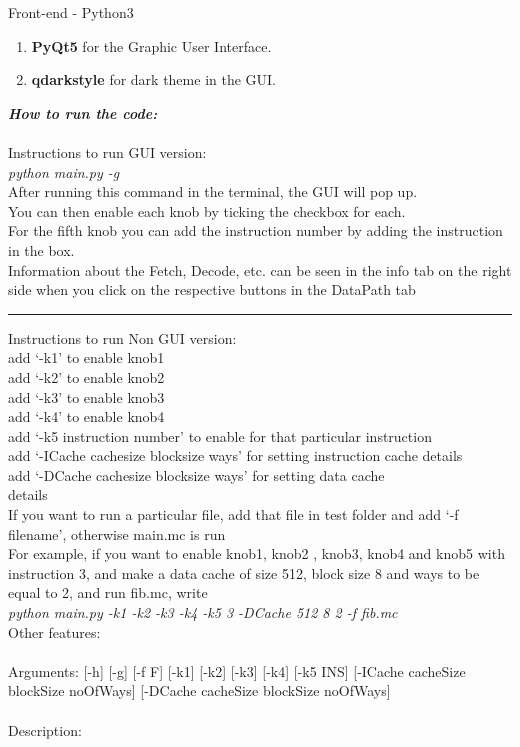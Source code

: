 \documentclass{article}
\begin{document}
Front-end - Python3
\begin{enumerate}
  \item {\bf PyQt5} for the Graphic User Interface.
  \item {\bf qdarkstyle} for dark theme in the GUI.
\end{enumerate}
\newpage
\textsl{\textbf{How to run the code:}}\\\\
\textsf{Instructions to run GUI version:}\\
\textsl{python main.py -g}\\
After running this command in the terminal, the GUI will pop up.\\
You can then enable each knob by ticking the checkbox for each.\\
For the fifth knob you can add the instruction number by adding the instruction in the box.\\
Information about the Fetch, Decode, etc. can be seen in the info tab on the right side when you click on the respective buttons in the DataPath tab
\par\noindent\rule{\textwidth}{0.4pt}
\textsf{Instructions to run Non GUI version:}\\
add `-k1' to enable knob1\\
add `-k2' to enable knob2\\
add `-k3' to enable knob3\\
add `-k4' to enable knob4\\
add `-k5 instruction number' to enable for that particular instruction\\
add `-ICache cachesize blocksize ways' for setting instruction cache details\\
add `-DCache cachesize blocksize ways' for setting data cache \\details\\
If you want to run a particular file, add that file in test folder and add `-f filename', otherwise main.mc is run\\
For example, if you want to enable knob1, knob2 , knob3, knob4 and knob5 with instruction 3, and make a data cache of size 512, block size 8 and ways to be equal to 2, and run fib.mc, write\\
\textsl{python main.py -k1 -k2 -k3 -k4 -k5 3 -DCache 512 8 2 -f fib.mc}\\
\newpage
\noindent
\textsf{Other features:}\\
\\
Arguments: [-h] [-g] [-f F] [-k1] [-k2] [-k3] [-k4] [-k5 INS] [-ICache cacheSize blockSize noOfWays] [-DCache cacheSize blockSize noOfWays]\\\\
\textsf{Description:}\\
\end{document}
